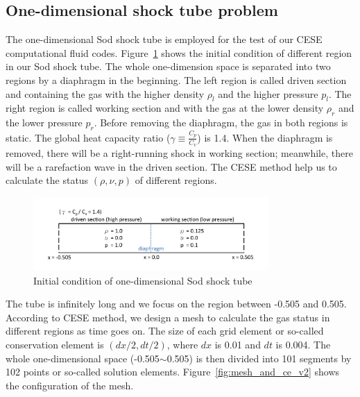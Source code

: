 \documentclass[a4paper,12pt]{article}
\begin{document}
\subsection{One-dimensional shock tube problem}
 \label{sec:1d_shock_tube}

The one-dimensional Sod shock tube is employed for the test of our CESE computational fluid codes. Figure~\ref{fig:sod_shock_tube_1D} shows the initial condition of different region in our Sod shock tube. The whole one-dimension space is separated into two regions by a diaphragm in the beginning. 
The left region is called driven section and containing the gas with the higher density $\rho_l$ and the higher pressure $p_l$. The right region is called working section and with the gas at the lower density $\rho_r$ and the lower pressure $p_r$. Before removing the diaphragm, the gas in both regions is static. 
The global heat capacity ratio ($\gamma\equiv\frac{C_p}{C_v}$) is 1.4.
When the diaphragm is removed, there will be a right-running shock in working section; meanwhile, there will be a rarefaction wave in the driven section. The CESE method help us to calculate the status $(\rho, \nu, p)$ of different regions.

 \begin{figure}[hbtp]
    \centering
     \includegraphics[width=0.8\textwidth]{sod_shock_tube_1D.pdf}
     \caption{Initial condition of one-dimensional Sod shock tube}
     \label{fig:sod_shock_tube_1D}
 \end{figure}

The tube is infinitely long and we focus on the region between -0.505 and 0.505. According to CESE method, we design a mesh to calculate the gas status in different regions as time goes on. The size of each grid element or so-called conservation element is $(dx/2, dt/2)$, where $dx$ is 0.01 and $dt$ is 0.004. 
The whole one-dimensional space (-0.505$\sim$0.505) is then divided into 101 segments by 102 points or so-called solution elements. Figure~\ref{fig:mesh_and_ce_v2} shows the configuration of the mesh. 
\end{document}
